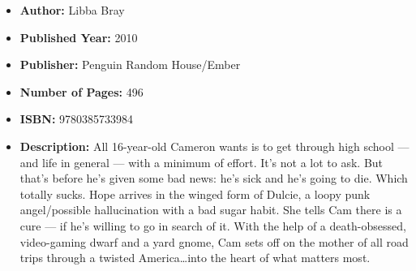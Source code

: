 \documentclass{tufte-handout}
\begin{document}
\begin{itemize}
    \item[] \textbf{Author:} Libba Bray
    \item[] \textbf{Published Year:} 2010 
    \item[] \textbf{Publisher:} Penguin Random House/Ember
    \item[] \textbf{Number of Pages:} 496      
    \item[] \textbf{ISBN:} 9780385733984
    \item[] \textbf{Description:} All 16-year-old Cameron wants is to get through high school --- and life in general --- with a minimum of effort. It’s not a lot to ask. But that’s before he’s given some bad news: he’s sick and he’s going to die. Which totally sucks. Hope arrives in the winged form of Dulcie, a loopy punk angel/possible hallucination with a bad sugar habit. She tells Cam there is a cure --- if he’s willing to go in search of it. With the help of a death-obsessed, video-gaming dwarf and a yard gnome, Cam sets off on the mother of all road trips through a twisted America\ldots into the heart of what matters most.
\end{itemize}
\end{document}

